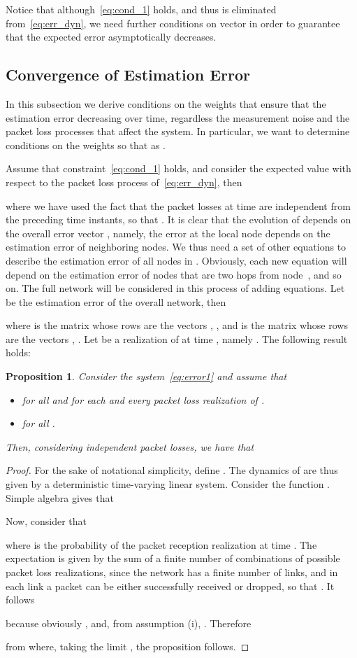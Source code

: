 \documentclass[a4paper,notitlepage,onecolumn]{article}
\newtheorem{proposition}[theorem]{Proposition}
\numberwithin{equation}{section}
\begin{document}
Notice that although~\eqref{eq:cond_1} holds, and thus  is
eliminated from~\eqref{eq:err_dyn}, we need further conditions on
vector  in order to guarantee that the
expected error asymptotically decreases.

\subsection{Convergence of Estimation Error}

In this subsection we derive conditions on the weights that ensure
that the estimation error decreasing over time, regardless the
measurement noise and the packet loss processes that affect the
system. In particular, we want to determine conditions on the
weights so that  as
.

Assume that constraint~\eqref{eq:cond_1} holds, and consider the
expected value with respect to the packet loss process
of~\eqref{eq:err_dyn}, then

where we have used the fact that the packet losses at time  are
independent from the preceding time instants, so that . It is clear that the evolution of
 depends on the overall error vector
, namely, the error at the local node depends
on the estimation error of neighboring nodes. We thus need a set
of other  equations to describe the estimation
error of all nodes in . Obviously, each new
equation will depend on the estimation error of nodes that are two
hops from node~, and so on. The full network will be considered
in this process of adding equations. Let  be the estimation error of the overall network, then

where  is the matrix whose rows are the vectors , ,
and  is the matrix whose rows are the vectors , . Let  be a realization of  at time , namely . The following result holds:
\begin{proposition}
\label{prop:error-stability} Consider the
system~\eqref{eq:error1} and assume that
\begin{itemize}
\item[(i)]   for all  and
    for each and every packet loss realization 
    of .
\item[(ii)]  for all .
\end{itemize}
Then, considering independent packet losses, we have that

\end{proposition}
\begin{proof}
For the sake of notational simplicity, define
. The dynamics of
 are thus given by a deterministic time-varying linear
system. Consider the function
. Simple algebra gives that

Now, consider that

where  is the probability of the packet reception realization  at time . The expectation is given by the sum of a finite number of combinations  of possible packet loss realizations, since the network has a finite number of links, and in each link a packet can be either successfully received or dropped, so that . It follows

because obviously , and, from assumption (i), . Therefore

from where, taking the limit , the proposition follows.
\end{proof}
\end{document}
